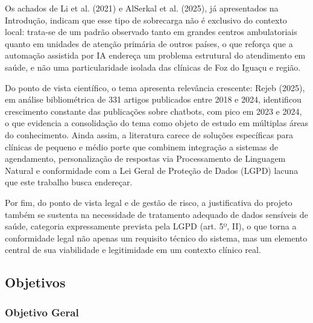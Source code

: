 \documentclass[12pt,a4paper]{extarticle}
\begin{document}

Os achados de Li et al. (2021) e AlSerkal et al. (2025), já apresentados na Introdução, indicam que esse tipo de sobrecarga não é exclusivo do contexto local: trata-se de um padrão observado tanto em grandes centros ambulatoriais quanto em unidades de atenção primária de outros países, o que reforça que a automação assistida por IA endereça um problema estrutural do atendimento em saúde, e não uma particularidade isolada das clínicas de Foz do Iguaçu e região.

Do ponto de vista científico, o tema apresenta relevância crescente: Rejeb (2025), em análise bibliométrica de 331 artigos publicados entre 2018 e 2024, identificou crescimento constante das publicações sobre chatbots, com pico em 2023 e 2024, o que evidencia a consolidação do tema como objeto de estudo em múltiplas áreas do conhecimento. Ainda assim, a literatura carece de soluções específicas para clínicas de pequeno e médio porte que combinem integração a sistemas de agendamento, personalização de respostas via Processamento de Linguagem Natural e conformidade com a Lei Geral de Proteção de Dados (LGPD) lacuna que este trabalho busca endereçar.

Por fim, do ponto de vista legal e de gestão de risco, a justificativa do projeto também se sustenta na necessidade de tratamento adequado de dados sensíveis de saúde, categoria expressamente prevista pela LGPD (art. 5º, II), o que torna a conformidade legal não apenas um requisito técnico do sistema, mas um elemento central de sua viabilidade e legitimidade em um contexto clínico real.

\subsection{Objetivos}

\subsubsection{Objetivo Geral}
\end{document}
